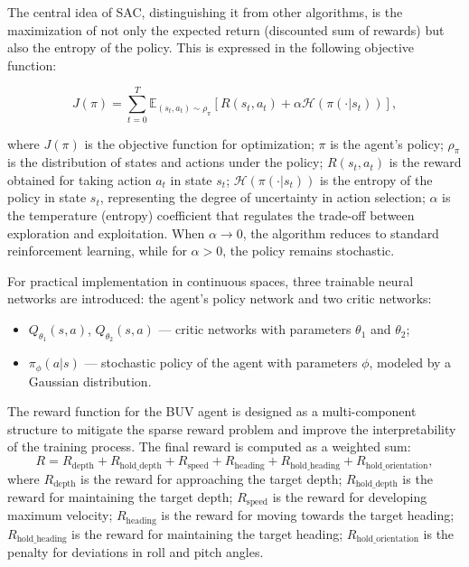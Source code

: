\documentclass[12pt]{revtex4}
\begin{document}
The central idea of SAC, distinguishing it from other algorithms, 
is the maximization of not only the expected return (discounted sum 
of rewards) but also the entropy of the policy. This is expressed in 
the following objective function:

\[
J(\pi) = \sum_{t=0}^{T} \mathbb{E}_{(s_t, a_t) \sim \rho_\pi} \left[ R(s_t, a_t) + \alpha \mathcal{H}(\pi(\cdot|s_t)) \right],
\]

where $J(\pi)$ is the objective function for optimization; $\pi$ is the agent's policy; $\rho_\pi$ is the distribution of states and actions under the policy; $R(s_t, a_t)$ is the reward obtained for taking action $a_t$ in state $s_t$; $\mathcal{H}(\pi(\cdot|s_t))$ is the entropy of the policy in state $s_t$, representing the degree of uncertainty in action selection; $\alpha$ is the temperature (entropy) coefficient that regulates the trade-off between exploration and exploitation. When $\alpha \to 0$, the algorithm reduces to standard reinforcement learning, while for $\alpha > 0$, the policy remains stochastic.

For practical implementation in continuous spaces, three trainable neural networks are introduced: the agent's policy network and two critic networks:
\begin{itemize}
\item $Q_{\theta_1}(s, a)$, $Q_{\theta_2}(s, a)$ --- critic networks with parameters $\theta_1$ and $\theta_2$;
\item $\pi_\phi(a|s)$ --- stochastic policy of the agent with parameters $\phi$, modeled by a Gaussian distribution.
\end{itemize}

The reward function for the BUV agent is designed as a multi-component structure to mitigate the sparse reward problem and improve the interpretability of the training process. The final reward is computed as a weighted sum:
\begin{equation}
R = R_{\text{depth}} + R_{\text{hold\_depth}} + R_{\text{speed}} + R_{\text{heading}} + R_{\text{hold\_heading}} + R_{\text{hold\_orientation}},
\end{equation}
where $R_{\text{depth}}$ is the reward for approaching the target depth; $R_{\text{hold\_depth}}$ is the reward for maintaining the target depth; $R_{\text{speed}}$ is the reward for developing maximum velocity; $R_{\text{heading}}$ is the reward for moving towards the target heading; $R_{\text{hold\_heading}}$ is the reward for maintaining the target heading; $R_{\text{hold\_orientation}}$ is the penalty for deviations in roll and pitch angles.
\end{document}
